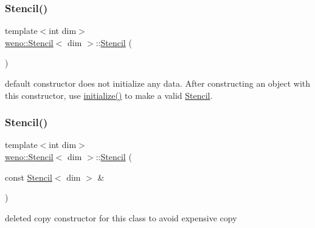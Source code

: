 \subsubsection{\texorpdfstring{Stencil()}{Stencil()}\hspace{0.1cm}{\footnotesize\ttfamily [1/3]}}
{\footnotesize\ttfamily template$<$int dim$>$ \\
\hyperlink{classweno_1_1_stencil}{weno\+::\+Stencil}$<$ dim $>$\+::\hyperlink{classweno_1_1_stencil}{Stencil} (\begin{DoxyParamCaption}{ }\end{DoxyParamCaption})\hspace{0.3cm}{\ttfamily [default]}}



default constructor does not initialize any data. After constructing an object with this constructor, use \hyperlink{classweno_1_1_stencil_a765c64da48da663c23b80f397386f9f9}{initialize()} to make a valid \hyperlink{classweno_1_1_stencil}{Stencil}. 

\mbox{\label{classweno_1_1_stencil_abcc20e0ca13837c075f9cf6f946123ad}} 
\subsubsection{\texorpdfstring{Stencil()}{Stencil()}\hspace{0.1cm}{\footnotesize\ttfamily [2/3]}}
{\footnotesize\ttfamily template$<$int dim$>$ \\
\hyperlink{classweno_1_1_stencil}{weno\+::\+Stencil}$<$ dim $>$\+::\hyperlink{classweno_1_1_stencil}{Stencil} (\begin{DoxyParamCaption}\item[{const \hyperlink{classweno_1_1_stencil}{Stencil}$<$ dim $>$ \&}]{ }\end{DoxyParamCaption})\hspace{0.3cm}{\ttfamily [delete]}}



deleted copy constructor for this class to avoid expensive copy 

\mbox{\label{classweno_1_1_stencil_a2f0e7f4ddbe54f7d49a562a46a4ac2fd}} 
